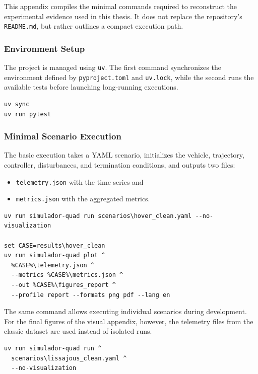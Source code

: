This appendix compiles the minimal commands required to reconstruct the experimental evidence used in this thesis. It does not replace the repository's \texttt{README.md}, but rather outlines a compact execution path.

\subsubsection*{Environment Setup}

The project is managed using \texttt{uv}. The first command synchronizes the environment defined by \texttt{pyproject.toml} and \texttt{uv.lock}, while the second runs the available tests before launching long-running executions.

\begin{verbatim}
uv sync
uv run pytest
\end{verbatim}

\subsubsection*{Minimal Scenario Execution}

The basic execution takes a YAML scenario, initializes the vehicle, trajectory, controller, disturbances, and termination conditions, and outputs two files:
\begin{itemize}
  \item \texttt{telemetry.json} with the time series and
  \item \texttt{metrics.json} with the aggregated metrics.
\end{itemize}

\begin{verbatim}
uv run simulador-quad run scenarios\hover_clean.yaml --no-visualization

set CASE=results\hover_clean
uv run simulador-quad plot ^
  %CASE%\telemetry.json ^
  --metrics %CASE%\metrics.json ^
  --out %CASE%\figures_report ^
  --profile report --formats png pdf --lang en
\end{verbatim}

The same command allows executing individual scenarios during development. For the final figures of the visual appendix, however, the telemetry files from the classic dataset are used instead of isolated runs.

\begin{verbatim}
uv run simulador-quad run ^
  scenarios\lissajous_clean.yaml ^
  --no-visualization
\end{verbatim}

